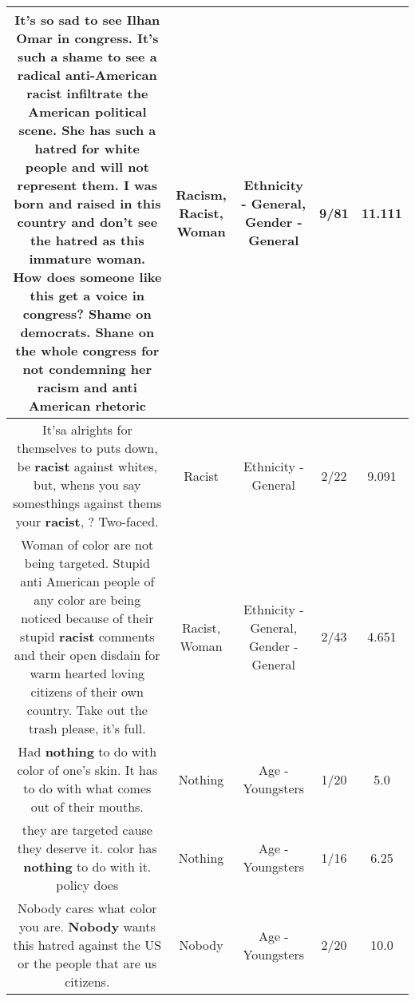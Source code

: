 \documentclass[11pt]{article}
\newlength\mylength
\begin{document}
\begin{center}
\begin{longtable}{|C{.65\mylength}|C{.30\mylength}|C{.12\mylength}|C{.12\mylength}|C{.12\mylength}|}
  \small It's so sad to see Ilhan Omar in congress. It's such a shame to see a radical anti-American \textbf{racist} infiltrate the American political scene.  She has such a hatred for white people and will not represent them. I was born and raised in this country and don't see the hatred as this immature \textbf{woman}. How does someone like this get a voice in congress? Shame on democrats. Shane on the whole congress for not condemning her \textbf{racism} and anti American rhetoric\normalsize   & Racism, Racist, Woman & Ethnicity - General, Gender - General & 9/81 & 11.111 \\  \hline
  \small It'sa  alrights  for  themselves  to  puts  down, be  \textbf{racist}  against  whites,  but,  whens  you  say  somesthings  against  thems  your  \textbf{racist}, ?  Two-faced.\normalsize   & Racist & Ethnicity - General & 2/22 & 9.091 \\  \hline
  \small Woman of color are not being targeted. Stupid anti American people of any color are being noticed because of their stupid \textbf{racist} comments and their open disdain for warm hearted loving citizens of their own country. Take out the trash please, it's full.\normalsize   & Racist, Woman & Ethnicity - General, Gender - General & 2/43 & 4.651 \\  \hline
  \small Had \textbf{nothing} to do with color of one's skin.  It has to do with what comes out of their mouths.\normalsize   & Nothing & Age - Youngsters & 1/20 & 5.0 \\  \hline
  \small they are targeted cause they deserve it. color has \textbf{nothing} to do with it. policy does\normalsize   & Nothing & Age - Youngsters & 1/16 & 6.25 \\  \hline
  \small Nobody cares what color you are. \textbf{Nobody} wants this hatred against the US or the people that are us citizens.\normalsize   & Nobody & Age - Youngsters & 2/20 & 10.0 \\  \hline

\end{longtable}
\end{center}
\end{document}
